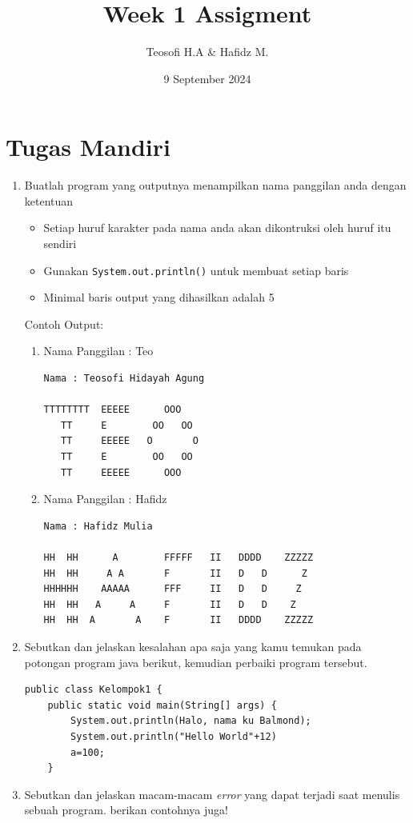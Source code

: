 \documentclass{article}
\title{\textbf{Week 1 Assigment}}
\date{9 September 2024}
\author{Teosofi H.A \& Hafidz M.}
\begin{document}
    \maketitle
    \section*{Tugas Mandiri}
    \begin{enumerate}
        \item Buatlah program yang outputnya menampilkan nama panggilan anda dengan ketentuan
        \begin{itemize}
            \item Setiap huruf karakter pada nama anda akan dikontruksi oleh huruf itu sendiri
            \item Gunakan \texttt{\color{lblue}System.out.println()} untuk membuat setiap baris
            \item Minimal baris output yang dihasilkan adalah 5
        \end{itemize}
        Contoh Output:
        \begin{enumerate}[label=(\arabic*)]
            \item Nama Panggilan : Teo
            \begin{lstlisting}[style=output]
Nama : Teosofi Hidayah Agung

TTTTTTTT  EEEEE      OOO  
   TT     E        OO   OO
   TT     EEEEE   O       O
   TT     E        OO   OO
   TT     EEEEE      OOO
            \end{lstlisting}
            \item Nama Panggilan : Hafidz
            \begin{lstlisting}[style=output]
Nama : Hafidz Mulia

HH  HH      A        FFFFF   II   DDDD    ZZZZZ
HH  HH     A A       F       II   D   D      Z
HHHHHH    AAAAA      FFF     II   D   D     Z
HH  HH   A     A     F       II   D   D    Z
HH  HH  A       A    F       II   DDDD    ZZZZZ
            \end{lstlisting}
        \end{enumerate}
        
        
        \item Sebutkan dan jelaskan kesalahan apa saja yang kamu temukan pada potongan program java berikut, kemudian perbaiki program tersebut.
        \begin{lstlisting}[style=standard]
public class Kelompok1 {
    public static void main(String[] args) {
        System.out.println(Halo, nama ku Balmond);
        System.out.println("Hello World"+12)
        a=100;
    }
        \end{lstlisting}

        \item Sebutkan dan jelaskan macam-macam \textit{error} yang dapat terjadi saat menulis sebuah program. berikan contohnya juga!
    \end{enumerate}
\end{document}

